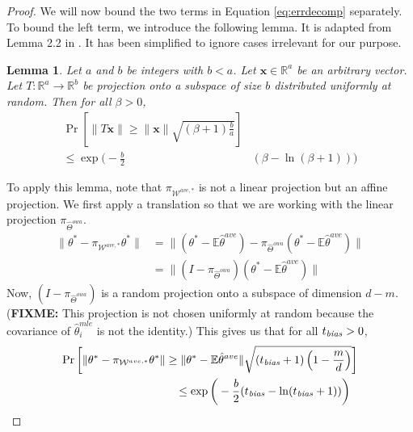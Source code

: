 \documentclass[twoside]{article}
\newtheorem{lemma}{Lemma}
\newcommand{\W}{{\hat \Theta^{\textit{owa}}}}
\newcommand{\Wtave}{{\mathcal{W}^{ave,*}}}
\newcommand{\E}{\mathbb{E}}
\newcommand{\x}{\mathbf{x}}
\newcommand{\w}{\theta}
\newcommand{\wtave}{\E\hat\w^{ave}}
\newcommand{\wmle}{\hat\w^{mle}}
\newcommand{\wstar}{{\w^{*}}}
\newcommand{\tbias}{t_{\text{\textit{bias}}}}
\newcommand{\ltwo}[1]{{\lVert {#1} \rVert}}
\newcommand{\proj}[1]{\pi_{{#1}}}
\newcommand{\prob}[1]{\Pr\left[{#1}\right]}
\newcommand{\fixme}[1]{\textbf{FIXME:} {#1}}
\begin{document}
\begin{proof}
{%

We will now bound the two terms in Equation \ref{eq:errdecomp} separately.
To bound the left term, we introduce the following lemma.
It is adapted from Lemma 2.2 in \cite{dasgupta2003elementary}.
It has been simplified to ignore cases irrelevant for our purpose.
\begin{lemma}
Let $a$ and $b$ be integers with $b<a$.
Let $\x\in\mathbb{R}^a$ be an arbitrary vector.
Let $T : \mathbb{R}^a \to \mathbb{R}^b$ be projection onto a subspace of size $b$ distributed uniformly at random.
Then for all $\beta>0$,
\begin{equation}
\begin{split}
\prob{\ltwo{T\x} \ge \ltwo\x\sqrt{(\beta + 1)\frac{b}{a}}}&
\\
\le
\exp \bigg(-\frac{b}{2} & (\beta-\ln(\beta+1))\bigg)
\end{split}
\end{equation}
\end{lemma}
To apply this lemma, note that $\proj\Wtave$ is not a linear projection but an affine projection.
We first apply a translation so that we are working with the linear projection $\proj\W$.
\begin{align}
\ltwo{\wstar-\proj\Wtave\wstar}
&=
\ltwo{(\wstar-\wtave)-\proj\W(\wstar-\wtave)}
\\
&=
\ltwo{(I-\proj\W)(\wstar-\wtave)}
\end{align}
Now, $(I-\proj\W)$ is a random projection onto a subspace of dimension $d-m$.
(\fixme{This projection is not chosen uniformly at random because the covariance of $\wmle_i$ is not the identity.})
This gives us that for all $\tbias>0$,
\begin{equation}
\begin{split}
\prob{\ltwo{\wstar-\proj\Wtave\wstar} \ge \ltwo{\wstar-\wtave}\sqrt{(\tbias + 1)\left(1-\frac{m}{d}\right)}}&
\\
\le
\exp \bigg(-\frac{b}{2} (\tbias-\ln(\tbias+1))\bigg)~~&
\end{split}
\end{equation}
}

\end{proof}
\end{document}
